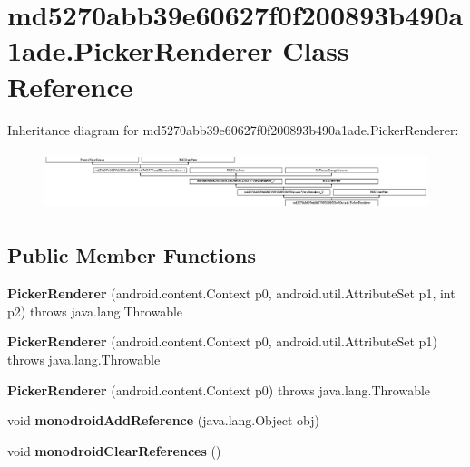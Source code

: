 \hypertarget{classmd5270abb39e60627f0f200893b490a1ade_1_1PickerRenderer}{}\section{md5270abb39e60627f0f200893b490a1ade.\+Picker\+Renderer Class Reference}
\label{classmd5270abb39e60627f0f200893b490a1ade_1_1PickerRenderer}
Inheritance diagram for md5270abb39e60627f0f200893b490a1ade.\+Picker\+Renderer\+:\begin{figure}[H]
\begin{center}
\leavevmode
\includegraphics[height=1.754386cm]{classmd5270abb39e60627f0f200893b490a1ade_1_1PickerRenderer}
\end{center}
\end{figure}
\subsection*{Public Member Functions}
\begin{DoxyCompactItemize}
\item 
\mbox{\label{classmd5270abb39e60627f0f200893b490a1ade_1_1PickerRenderer_a00b8590adecab516a7110fb8577fd90a}} 
{\bfseries Picker\+Renderer} (android.\+content.\+Context p0, android.\+util.\+Attribute\+Set p1, int p2)  throws java.\+lang.\+Throwable 	
\item 
\mbox{\label{classmd5270abb39e60627f0f200893b490a1ade_1_1PickerRenderer_a156d92620e136f1f59df295adf38b21e}} 
{\bfseries Picker\+Renderer} (android.\+content.\+Context p0, android.\+util.\+Attribute\+Set p1)  throws java.\+lang.\+Throwable 	
\item 
\mbox{\label{classmd5270abb39e60627f0f200893b490a1ade_1_1PickerRenderer_ac8b874ff9d60efd6f0108f2c112b26b9}} 
{\bfseries Picker\+Renderer} (android.\+content.\+Context p0)  throws java.\+lang.\+Throwable 	
\item 
\mbox{\label{classmd5270abb39e60627f0f200893b490a1ade_1_1PickerRenderer_a777d5b35ed425b737ed67a6488c800c8}} 
void {\bfseries monodroid\+Add\+Reference} (java.\+lang.\+Object obj)
\item 
\mbox{\label{classmd5270abb39e60627f0f200893b490a1ade_1_1PickerRenderer_a8ea4822897e59386ee80a0fccf40c367}} 
void {\bfseries monodroid\+Clear\+References} ()
\end{DoxyCompactItemize}

